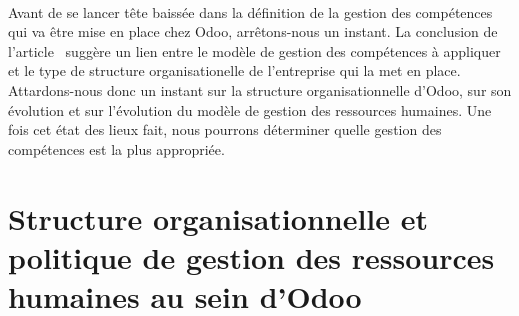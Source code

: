 \paragraph{}Avant de se lancer tête baissée dans la définition de la gestion des compétences qui va être mise en place chez Odoo, arrêtons-nous un instant. La conclusion de l'article~\citep{delobbe} suggère un lien entre le modèle de gestion des compétences à appliquer et le type de structure organisationelle de l'entreprise qui la met en place. Attardons-nous donc un instant sur la structure organisationnelle d'Odoo, sur son évolution et sur l'évolution du modèle de gestion des ressources humaines. Une fois cet état des lieux fait, nous pourrons déterminer quelle gestion des compétences est la plus appropriée.
        



\section{Structure organisationnelle et politique de gestion des ressources humaines au sein d'Odoo}
